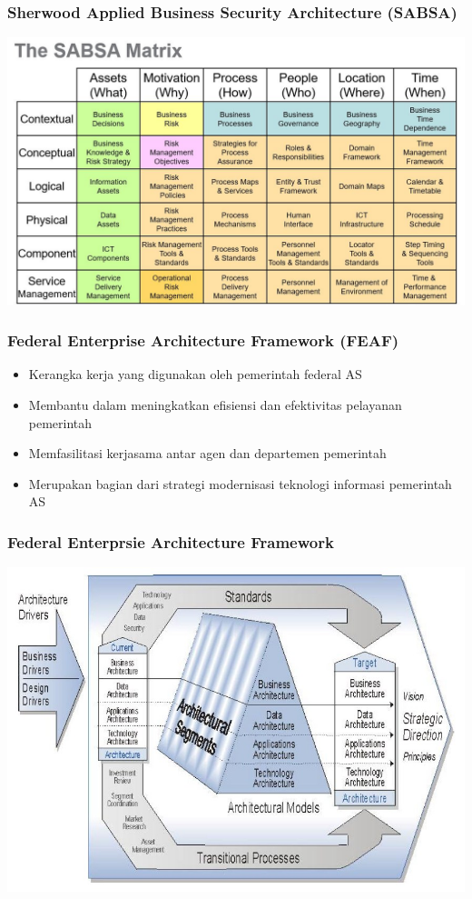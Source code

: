 \documentclass{beamer}
\begin{document}
	{
		\begin{frame}
			\frametitle{Sherwood Applied Business Security Architecture (SABSA)}
			\begin{center}
				\includegraphics[width=1\textwidth]{../figures/sabsa}
			\end{center}
		\end{frame}
	}

	
	\begin{frame}
		\frametitle{Federal Enterprise Architecture Framework (FEAF)}
		\begin{itemize}
			\item Kerangka kerja yang digunakan oleh pemerintah federal AS
			\item Membantu dalam meningkatkan efisiensi dan efektivitas pelayanan pemerintah
			\item Memfasilitasi kerjasama antar agen dan departemen pemerintah
			\item Merupakan bagian dari strategi modernisasi teknologi informasi pemerintah AS
		\end{itemize}
	\end{frame}
	
	{
		\begin{frame}
			\frametitle{Federal Enterprsie Architecture Framework}
			\begin{center}
				\includegraphics[width=.95\textwidth]{../figures/feaf}
			\end{center}
		\end{frame}
	}
\end{document}
